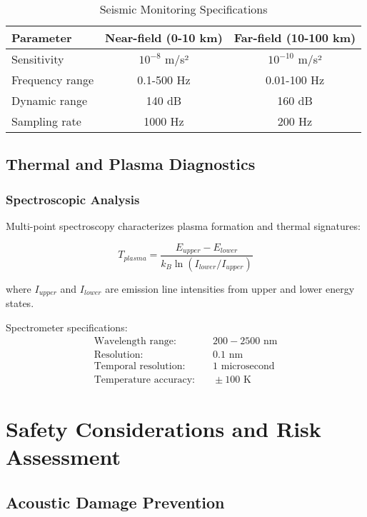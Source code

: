 \documentclass[12pt,a4paper]{article}
\begin{document}
\begin{table}[H]
\centering
\caption{Seismic Monitoring Specifications}
\label{tab:seismic_specs}
\begin{tabular}{lcc}
\toprule
Parameter & Near-field (0-10 km) & Far-field (10-100 km) \\
\midrule
Sensitivity & $10^{-8}$ m/s² & $10^{-10}$ m/s² \\
Frequency range & 0.1-500 Hz & 0.01-100 Hz \\
Dynamic range & 140 dB & 160 dB \\
Sampling rate & 1000 Hz & 200 Hz \\
\bottomrule
\end{tabular}
\end{table}

\subsection{Thermal and Plasma Diagnostics}

\subsubsection{Spectroscopic Analysis}
Multi-point spectroscopy characterizes plasma formation and thermal signatures:

\begin{equation}
T_{plasma} = \frac{E_{upper} - E_{lower}}{k_B \ln(I_{lower}/I_{upper})}
\label{eq:plasma_temperature}
\end{equation}

where $I_{upper}$ and $I_{lower}$ are emission line intensities from upper and lower energy states.

Spectrometer specifications:
\begin{align}
\text{Wavelength range:} &\quad 200-2500 \text{ nm} \\
\text{Resolution:} &\quad 0.1 \text{ nm} \\
\text{Temporal resolution:} &\quad 1 \text{ microsecond} \\
\text{Temperature accuracy:} &\quad \pm 100 \text{ K}
\end{align}

\section{Safety Considerations and Risk Assessment}

\subsection{Acoustic Damage Prevention}
\end{document}
